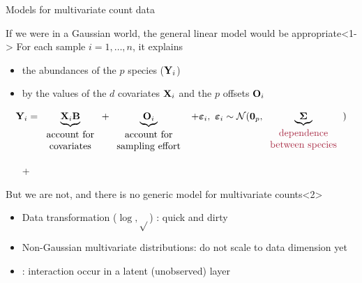 \documentclass[10pt, c, xcolor=x11names]{beamer}\usepackage[]{graphicx}\usepackage[]{color}
\begin{document}
\begin{frame}{Models for multivariate count data}

  \begin{block}{If we were in a Gaussian world, the \alert{general linear model} would be appropriate}<1->
    For each sample $i = 1,\dots,n$, it explains 
    \begin{itemize}
    \item the abundances of the $p$ species ($\mathbf{Y}_i$) 
    \item by the values of the $d$ covariates $\mathbf{X}_i$ and the $p$ offsets $\mathbf{O}_i$
    \end{itemize}
    \begin{equation*}
      \bY_i = 
      \underbrace{\bX_i \mathbf{B}}_{\begin{tabular}{c} \text{account for} \\ \text{covariates}  \end{tabular}} 
      + \underbrace{\bO_i}_{\begin{tabular}{c} \text{account for} \\ \text{sampling effort}  \end{tabular}}
      \ + \bvarepsilon_i, 
      \ \bvarepsilon_i \sim \mathcal{N}(\bzr_p, \underbrace{\bSigma}_{\begin{tabular}{c} \text{\emphase{dependence}} \\ \text{\emphase{between species}}  \end{tabular}})
    \end{equation*}
    \begin{itemize}
      \item[\textcolor{mred}{+}] 
    \end{itemize}
  \end{block}

  \begin{block}{But we are not, and there is no generic model for multivariate counts}<2>
    \begin{itemize}
      \item Data transformation ($\log{}, \sqrt{} $) : quick and dirty \\
      \item Non-Gaussian multivariate distributions: do not scale to data dimension yet \\
      \item {}: interaction occur in a latent (unobserved) layer\\
    \end{itemize}
  \end{block}
    
\end{frame}
\end{document}
